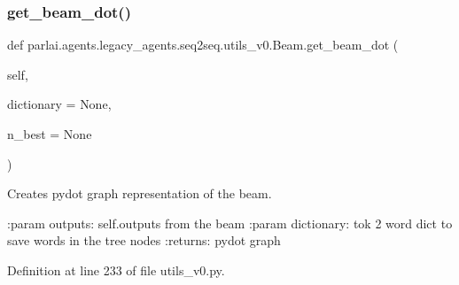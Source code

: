 \subsubsection{\texorpdfstring{get\+\_\+beam\+\_\+dot()}{get\_beam\_dot()}}
{\footnotesize\ttfamily def parlai.\+agents.\+legacy\+\_\+agents.\+seq2seq.\+utils\+\_\+v0.\+Beam.\+get\+\_\+beam\+\_\+dot (\begin{DoxyParamCaption}\item[{}]{self,  }\item[{}]{dictionary = {\ttfamily None},  }\item[{}]{n\+\_\+best = {\ttfamily None} }\end{DoxyParamCaption})}

\begin{DoxyVerb}Creates pydot graph representation of the beam.

:param outputs: self.outputs from the beam
:param dictionary: tok 2 word dict to save words in the tree nodes
:returns: pydot graph
\end{DoxyVerb}
 

Definition at line 233 of file utils\+\_\+v0.\+py.


